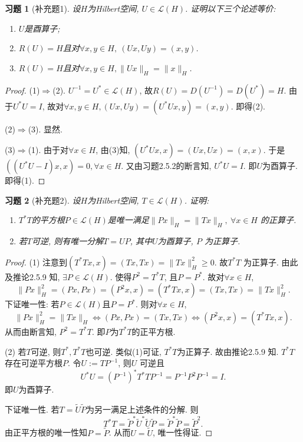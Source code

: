 \documentclass[UTF8,twoside]{ctexbook}
\newtheorem{exercise}{习题}[section]
\newcommand{\h}{\mathscr}
\newcommand{\kx}{\mathbb}
\numberwithin{equation}{section}
\begin{document}
	\begin{exercise}[补充题1]
		设$H$为Hilbert空间, $U\in\h L(H)$. 证明以下三个论述等价:
		\begin{enumerate}[(1)]
			\item$U$是酉算子;
			\item$R(U)=H$且对$\forall x,y\in H,\ (Ux,Uy)=(x,y)$.
			\item$R(U)=H$且对$\forall x,y\in H, \|Ux\|_H=\|x\|_H$.
		\end{enumerate}
	\end{exercise}
	\begin{proof}
		(1)$\Rightarrow$(2). $U^{-1}=U^*\in\h L(H)$, 故$R(U)=D(U^{-1})=D(U^*)=H$. 由于$U^*U=I$, 故对$\forall x,y\in H, (Ux,Uy)=(U^*Ux,y)=(x,y)$. 即得(2).

		(2)$\Rightarrow$(3). 显然.

		(3)$\Rightarrow$(1). 由于对$\forall x\in H$, 由(3)知, $(U^*Ux,x)=(Ux,Ux)=(x,x)$. 于是$((U^*U-I)x,x)=0,\forall x\in H$. 又由习题2.5.2的断言知, $U^*U=I$. 即$U$为酉算子. 即得(1).
	\end{proof}
	\begin{exercise}[补充题2]
		设$H$为Hilbert空间, $T\in\h L(H)$. 证明:
		\begin{enumerate}[(1)]
			\item$T^*T$的平方根$P\in\h L(H)$是唯一满足$\|Px\|_H=\|Tx\|_H,\ \forall x\in H$ 的正算子.
			\item 若$T$可逆, 则有唯一分解$T=UP$, 其中$U$为酉算子, $P$ 为正算子.
		\end{enumerate}
	\end{exercise}
	\begin{proof}
		(1) 注意到$(T^*Tx,x)=(Tx,Tx)=\|Tx\|_H^2\geq 0$. 故$T^*T$ 为正算子. 由此及推论2.5.9 知, $\exists P\in \h L(H)$. 使得$P^2=T^*T$, 且$P=P^*$. 故对$\forall x\in H$,
		\[
		\|Px\|_H^2=(Px,Px)=(P^2x,x)=(T^*Tx,x)=(Tx,Tx)=\|Tx\|_H^2.
		\]
		下证唯一性: 若$P\in \h L(H)$且$P=P^*$. 则对$\forall x\in H$,
		\[
		\|Px\|_H^2=\|Tx\|_H\Leftrightarrow (Px,Px)=(Tx,Tx) \Leftrightarrow (P^2x,x)=(T^*Tx,x).
		\]
		从而由断言知, $P^2=T^*T$. 即$P$为$T^*T$的正平方根.

		(2) 若$T$可逆, 则$T^*,T^*T$也可逆. 类似(1)可证, $T^*T$为正算子. 故由推论2.5.9 知. $T^*T$存在可逆平方根$P$. 令$U:=TP^{-1}$, 则$U$ 可逆且
		\[
		U^*U=(P^{-1})^*T^*TP^{-1}=P^{-1}P^2P^{-1}=I.
		\]
		即$U$为酉算子.

		下证唯一性. 若$T=\widetilde{U}\widetilde{P}$为另一满足上述条件的分解. 则
		\[
		T^*T=\widetilde{P}^*\widetilde{U}^*\widetilde{U}\widetilde{P}=\widetilde{P}^*\widetilde{P}=\widetilde{P}^2.
		\]
		由正平方根的唯一性知$P=\widetilde{P}$. 从而$U=\widetilde U$, 唯一性得证.
	\end{proof}

	
	
\end{document}
